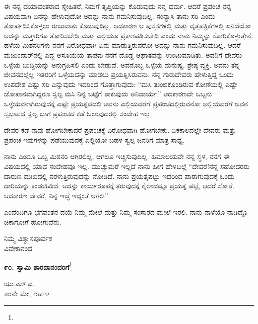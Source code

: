 ಈ ನನ್ನ ದಯಾವಂತರಾದ ಸ್ನೇಹಿತರೆ, ನಿಮಗೆ ತೃಪ್ತಿಯನ್ನು ಕೊಡುವುದು ನನ್ನ ಧರ್ಮ. ಆದರೆ ಪ್ರಪಂಚ ನನ್ನ ವಿಷಯವಾಗಿ ಏನನ್ನು ಹೇಳುವುದೋ ಅದನ್ನು ನಾನು ಗಮನಿಸುವುದಿಲ್ಲ. ಸಂನ್ಯಾಸಿ ತಾನು ಸರಿ ಎಂದು ತೋರ್ಪಡಿಸಿಕೊಳ್ಳಲು ರುಜುವಾತು ಕೊಡುವುದಿಲ್ಲ. ಆದಕಾರಣ ಆ ಪುಸ್ತಕಗಳಲ್ಲಿ ಮತ್ತು ವೃತ್ತಪತ್ರಿಕೆಗಳಲ್ಲಿ ಏನಿದೆಯೋ ಅದನ್ನು ಮತ್ತಾರಿಗೂ ತೋರಿಸಬೇಡಿ ಮತ್ತು ಎಲ್ಲಿಯೂ ಪ್ರಕಾಶಪಡಿಸಬೇಡಿ ಎಂದು ನಾನು ನಿಮ್ಮನ್ನು ಕೋರಿಕೊಳ್ಳುತ್ತೇನೆ. ಹಳೆಯ ಮಿಶನರಿಗಳು ನನಗೆ ವಿರೋಧವಾಗಿ ಏನು ಮಾಡುತ್ತಿರುವರೋ ಅದನ್ನು ನಾನು ಗಮನಿಸುವುದಿಲ್ಲ. ಆದರೆ ಮಜುಂದಾರ್‌ನಲ್ಲಿ ಎದ್ಧ ಅಸೂಯೆಯ ತಾಪವು ನನಗೆ ದೊಡ್ಡ ಆಘಾತವನ್ನು ಉಂಟುಮಾಡಿತು. ಅವನಿಗೆ ದೇವರು ಒಳ್ಳೆಯ ಬುದ್ದಿಯನ್ನು ಅನುಗ್ರಹಿಸಲಿ ಎಂದು ಬೇಡುವೆ. ಅವನೊಬ್ಬ ಒಳ್ಳೆಯ ಮನುಷ್ಯ, ಶ್ರೇಷ್ಠ ವ್ಯಕ್ತಿ. ಅವನು ತನ್ನ ಜೀವನದಲ್ಲೆಲ್ಲ ಇತರರಿಗೆ ಒಳ್ಳೆಯದನ್ನು ಮಾಡಲು ಪ್ರಯತ್ನಿಸಿರುವನು. ನನ್ನ ಗುರುದೇವರು ಹೇಳುತ್ತಿದ್ದ ಒಂದು ಉಪದೇಶ ಎಷ್ಟು ಸರಿ ಎನ್ನುವುದು ಇದರಿಂದ ಗೊತ್ತಾಗುವುದು: “ಮಸಿ ತುಂಬಿಕೊಂಡಿರುವ ಕೋಣೆಯಲ್ಲಿ ಎಷ್ಟೇ ಜೋಪಾನವಾಗಿದ್ದರೂ ಸ್ವಲ್ಪ ಮಸಿ ನಿನ್ನ ಬಟ್ಟೆಗೆ ತಾಕುವುದು ಅನಿವಾರ್ಯ.'' ಆದಕಾರಣವೇ ಒಬ್ಬನು ಒಳ್ಳೆಯವನಾಗಿರುವುದಕ್ಕೆ ಎಷ್ಟೇ ಪ್ರಯತ್ನಪಡಲಿ ಅವನು ಎಲ್ಲಿಯವರೆಗೆ ಪ್ರಪಂಚದಲ್ಲಿರುವನೋ ಅಲ್ಲಿಯವರೆಗೆ ಅವನ ಸ್ವಭಾವದ ಸ್ವಲ್ಪ ಭಾಗ ಪ್ರಪಂಚದ ಕಡೆ ಓಲುವುದರಲ್ಲಿ ಸಂದೇಹ ಇಲ್ಲ.

\vspace{0.1cm}

ದೇವರ ಕಡೆ ನಾವು ಹೋಗಬೇಕಾದರೆ ಪ್ರಪಂಚಕ್ಕೆ ವಿರೋಧವಾಗಿ ಹೋಗಬೇಕು. ಏಕಕಾಲದಲ್ಲೇ ದೇವರು ಮತ್ತು ಪ್ರಪಂಚ ಇವುಗಳನ್ನು ಪಡೆಯುವುದಕ್ಕೆ ಎಲ್ಲಿಯೋ ಬಹಳ ಸ್ವಲ್ಪ ಜನರಿಗೆ ಮಾತ್ರ ಸಾಧ್ಯ.

\vspace{0.1cm}

ನಾನು ಎಂದೂ ಒಬ್ಬ ಮಿಶನರಿ ಆಗಿರಲಿಲ್ಲ, ಆಗಲೂ ಇಚ್ಚಿಸುವುದಿಲ್ಲ. ಹಿಮಾಲಯವೇ ನನ್ನ ಸ್ಥಳ, ನನಗೆ ಈ ವಿಷಯದಲ್ಲಿ ಯಾವ ಸಂದೇಹವೂ ಇಲ್ಲ. ಮುಚ್ಚುಮರೆ ಇಲ್ಲದೆ ನಾನು ಹೀಗೆ ಹೇಳಬಲ್ಲೆ ``ದೇವರೆ!ನನ್ನ ಸಹೋದರರು ದಾರುಣ ದುಃಖದಲ್ಲಿ ನರಳುತ್ತಿರುವುದನ್ನು ನೋಡಿದೆ. ನಾನು ಪ್ರಯತ್ನಪಟ್ಟು ಇದರಿಂದ ಪಾರಾಗುವುದಕ್ಕೆ ಒಂದು ದಾರಿಯನ್ನು ಕಂಡುಹಿಡಿದೆ. ಅದನ್ನು ಕಾರ್ಯರೂಪಕ್ಕೆ ತರುವುದಕ್ಕೆ ಕೈಲಾದಷ್ಟೂ ಪ್ರಯತ್ನ ಪಟ್ಟೆ, ಆದರೆ ಸೋತೆ. ಆದಕಾರಣ ದೇವರೆ, ನಿನ್ನ ಇಚ್ಛೆ ಇದ್ದಂತೆ ಆಗಲಿ.”

\vspace{0.1cm}

ಎಂದೆಂದಿಗೂ ಭಗವಂತನ ದಯೆ ನಿಮ್ಮ ಮೇಲೆ ಮತ್ತು ನಿಮ್ಮ ಸಂಸಾರದ ಮೇಲೆ ಇರಲಿ. ನಾನು ನಾಳೆಯೊ ನಾಡಿದ್ದೊ ಚಿಕಾಗೋಗೆ ಹೋಗುವೆನು.

{\flushright
ನಿಮ್ಮ ವಿಶ್ವಾಸಪೂರ್ವಕ\\ವಿವೇಕಾನಂದ\par}

\begin{center}
\textbf{೯೦. ಸ್ವಾಮಿ ಶಾರದಾನಂದರಿಗೆ}\footnote{}
\end{center}

\begin{flushright}
ಯು.ಎಸ್.ಎ.\\೨೦ನೇ ಮೇ, ೧೮೯೪
\end{flushright}

